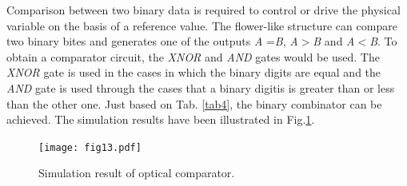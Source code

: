 \documentclass{osa-article}
\begin{document}
\begin{table}[H]
\caption{Logical truth table of the proposed TDM and OPP levels at the input and output (N.A = do not care).}
\centering 
{}
\label{tab3} %
\end{table}

Comparison between two binary data is required to control or drive the physical variable on the basis of a reference value. The flower-like structure can compare two binary bites and generates one of the outputs \textit {A} =\textit {B}, \textit {A}$>$\textit {B} and \textit {A}$<$\textit {B}. To obtain a comparator circuit, the \textit{XNOR} and \textit{AND} gates would be used. The \textit{XNOR} gate is used in the cases in which the binary digits are equal and the \textit{AND} gate is used through the cases that a binary digitis is greater than or less than the other one. Just based on Tab. \ref{tab4}, the binary combinator can be achieved. The simulation results have been illustrated in Fig.\ref{fig13}.\\
\begin{figure}[tb]
\centering
\texttt{[image: fig13.pdf]}
	\caption{Simulation result of optical comparator.}
	\label{fig13}
\end{figure}
 
\end{document}
